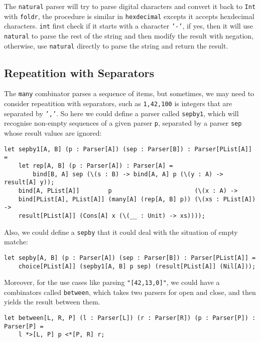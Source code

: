 The \texttt{natural} parser will try to parse digital characters and convert it back to \texttt{Int} with \texttt{foldr}, the procedure is similar in \texttt{hexdecimal} excepts it accepts hexdecimal characters. \texttt{int} first check if it starts with a character \texttt{'-'}, if yes, then it will use \texttt{natural} to parse the rest of the string and then modify the result with negation, otherwise, use \texttt{natural} directly to parse the string and return the result.

\subsection{Repeatition with Separators}

The \texttt{many} combinator parses a sequence of items, but sometimes, we may need to consider repeatition with separators, such as \texttt{1,42,100} is integers that are separated by \texttt{','}. So here we could define a parser called \texttt{sepby1}, which will recognise non-empty sequences of a given parser \texttt{p}, separated by a parser \texttt{sep} whose result values are ignored:

\begin{lstlisting}
let sepby1[A, B] (p : Parser[A]) (sep : Parser[B]) : Parser[PList[A]] =
    let rep[A, B] (p : Parser[A]) : Parser[A] =
        bind[B, A] sep (\(s : B) -> bind[A, A] p (\(y : A) -> result[A] y));
    bind[A, PList[A]]        p                       (\(x : A) ->
    bind[PList[A], PList[A]] (many[A] (rep[A, B] p)) (\(xs : PList[A]) ->
    result[PList[A]] (Cons[A] x (\(__ : Unit) -> xs))));
\end{lstlisting}

Also, we could define a \texttt{sepby} that it could deal with the situation of empty matche:

\begin{lstlisting}
let sepby[A, B] (p : Parser[A]) (sep : Parser[B]) : Parser[PList[A]] =
    choice[PList[A]] (sepby1[A, B] p sep) (result[PList[A]] (Nil[A]));
\end{lstlisting}

Moreover, for the use cases like parsing \texttt{"[42,13,0]"}, we could have a combinators called \texttt{between}, which takes two parsers for open and close, and then yields the result between them.

\begin{lstlisting}
let between[L, R, P] (l : Parser[L]) (r : Parser[R]) (p : Parser[P]) : Parser[P] =
    l *>[L, P] p <*[P, R] r;
\end{lstlisting}

